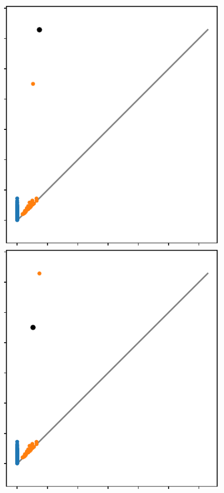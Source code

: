 \begin{figure}[htbp]
  \includegraphics[scale=0.65]{figures/circular_dgm1.pdf}\hspace{1in}
  \includegraphics[scale=0.65]{figures/circular_dgm2.pdf}
   \caption{}
   \label{fig:circular}
\end{figure}

